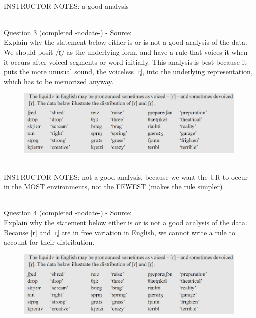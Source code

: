 \documentclass[12pt]{article}
\begin{document}
~\\
INSTRUCTOR NOTES: a good analysis


~\\

{\large Question 3} (completed -nodate-) - Source: \\

Explain why the statement below either is or is not a good analysis of the data.\\

We should posit /r̥/ as the underlying form, and have a rule that voices it when it occurs after voiced segments or word-initially. This analysis is best because it puts the more unusual sound, the voiceless {[r̥]}, into the underlying representation, which has to be memorized anyway.

\begin{figure}[H]
\includegraphics{../images/peng71_englishr.png}
\end{figure}

~\\
INSTRUCTOR NOTES: not a good analysis, because we want the UR to occur in the MOST environments, not the FEWEST (makes the rule simpler)


~\\

{\large Question 4} (completed -nodate-) - Source: \\

Explain why the statement below either is or is not a good analysis of the data.\\

Because {[r]} and {[r̥]} are in free variation in English, we cannot write a rule to account for their distribution.

\begin{figure}[H]
\includegraphics{../images/peng71_englishr.png}
\end{figure}
\end{document}
